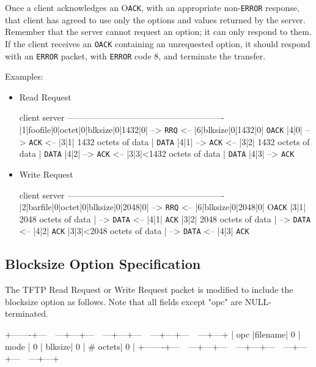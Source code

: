 \documentclass[12pt]{article}
\begin{document}
Once a client acknowledges an O\verb|ACK|, with an appropriate non-\verb|ERROR| response, that client has agreed to use only the options and values
returned by the server. Remember that the server cannot request an option; it can only respond to them. If the client receives an \verb|OACK| containing an unrequested option, it should respond with an  \verb|ERROR| packet, with  \verb|ERROR| code 8, and terminate the transfer.

Examples:
\begin{itemize}
\item Read Request

   client                      server
   -------------------------------------------------------
   |1|foofile|0|octet|0|blksize|0|1432|0| -->        \verb|RRQ|
                  <-- |6|blksize|0|1432|0|  \verb|OACK|
   |4|0| -->                        \verb|ACK|
               <-- |3|1| 1432 octets of data |  \verb|DATA|
   |4|1| -->                        \verb|ACK|
               <-- |3|2| 1432 octets of data |  \verb|DATA|
   |4|2| -->                        \verb|ACK|
               <-- |3|3|<1432 octets of data |  \verb|DATA|
   |4|3| -->                        \verb|ACK|

\item Write Request

   client                      server
   -------------------------------------------------------
   |2|barfile|0|octet|0|blksize|0|2048|0| -->        \verb|RRQ|
                  <-- |6|blksize|0|2048|0|  O\verb|ACK|
   |3|1| 2048 octets of data | -->             \verb|DATA|
                          <-- |4|1|  \verb|ACK|
   |3|2| 2048 octets of data | -->             \verb|DATA|
                          <-- |4|2|  \verb|ACK|
   |3|3|<2048 octets of data | -->             \verb|DATA|
                           <-- |4|3|  \verb|ACK|
\end{itemize}

\subsection{Blocksize Option Specification}
The TFTP Read Request or Write Request packet is modified to include the blocksize option as follows. Note that all fields except "opc" are NULL-terminated.

   +-------+---~~---+---+---~~---+---+---~~---+---+---~~---+---+
   | opc |filename| 0 | mode | 0 | blksize| 0 | \# octets| 0 |
   +-------+---~~---+---+---~~---+---+---~~---+---+---~~---+---+
\end{document}
